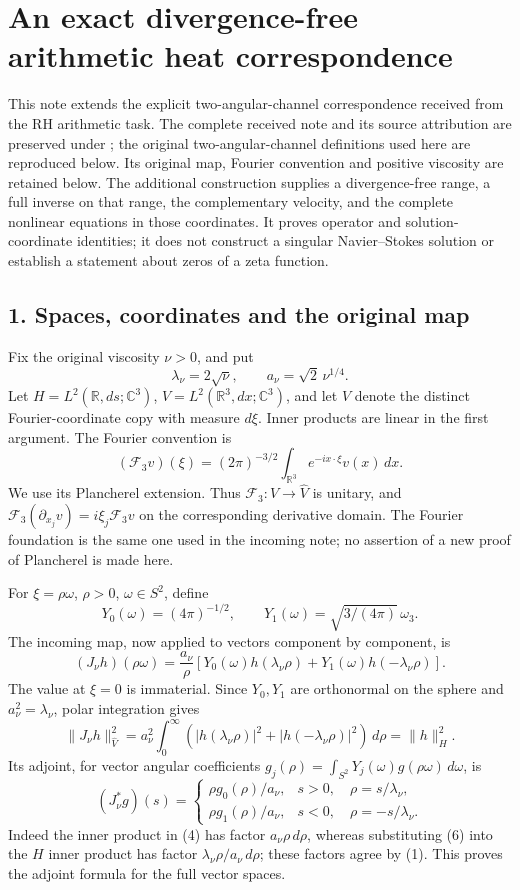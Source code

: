 \section*{An exact divergence-free arithmetic heat correspondence}

This note extends the explicit two-angular-channel correspondence received from the RH arithmetic task. The complete received note and its source attribution are preserved under ; the original two-angular-channel definitions used here are reproduced below. Its original map, Fourier convention and positive viscosity are retained below. The additional construction supplies a divergence-free range, a full inverse on that range, the complementary velocity, and the complete nonlinear equations in those coordinates. It proves operator and solution-coordinate identities; it does not construct a singular Navier--Stokes solution or establish a statement about zeros of a zeta function.

\subsection*{1. Spaces, coordinates and the original map}

Fix the original viscosity \(\nu>0\), and put \[
\lambda_\nu=2\sqrt\nu,\qquad a_\nu=\sqrt2\,\nu^{1/4}.
\tag{1}
\] Let \(H=L^2(\mathbb R,ds;\mathbb C^3)\), \(V=L^2(\mathbb R^3,dx;\mathbb C^3)\), and let \(\widehat V\) denote the distinct Fourier-coordinate copy with measure \(d\xi\). Inner products are linear in the first argument. The Fourier convention is \[
(\mathcal F_3v)(\xi)=(2\pi)^{-3/2}\int_{\mathbb R^3}e^{-ix\cdot\xi}v(x)\,dx.
\tag{2}
\] We use its Plancherel extension. Thus \(\mathcal F_3:V\to\widehat V\) is unitary, and \(\mathcal F_3(\partial_{x_j}v)=i\xi_j\mathcal F_3v\) on the corresponding derivative domain. The Fourier foundation is the same one used in the incoming note; no assertion of a new proof of Plancherel is made here.

For \(\xi=\rho\omega\), \(\rho>0\), \(\omega\in S^2\), define \[
Y_0(\omega)=(4\pi)^{-1/2},\qquad
Y_1(\omega)=\sqrt{3/(4\pi)}\,\omega_3.
\tag{3}
\] The incoming map, now applied to vectors component by component, is \[
(J_\nu h)(\rho\omega)=\frac{a_\nu}{\rho}
\left[Y_0(\omega)h(\lambda_\nu\rho)
      +Y_1(\omega)h(-\lambda_\nu\rho)\right].
\tag{4}
\] The value at \(\xi=0\) is immaterial. Since \(Y_0,Y_1\) are orthonormal on the sphere and \(a_\nu^2=\lambda_\nu\), polar integration gives \[
\|J_\nu h\|_{\widehat V}^2
=a_\nu^2\int_0^\infty
 (|h(\lambda_\nu\rho)|^2+|h(-\lambda_\nu\rho)|^2)\,d\rho
=\|h\|_H^2.
\tag{5}
\] Its adjoint, for vector angular coefficients \(g_j(\rho)=\int_{S^2}Y_j(\omega)g(\rho\omega)\,d\omega\), is \[
(J_\nu^*g)(s)=
\begin{cases}
\rho g_0(\rho)/a_\nu,&s>0,\quad\rho=s/\lambda_\nu,\\
\rho g_1(\rho)/a_\nu,&s<0,\quad\rho=-s/\lambda_\nu.
\end{cases}
\tag{6}
\] Indeed the inner product in (4) has factor \(a_\nu\rho\,d\rho\), whereas substituting (6) into the \(H\) inner product has factor \(\lambda_\nu\rho/a_\nu\,d\rho\); these factors agree by (1). This proves the adjoint formula for the full vector spaces.

